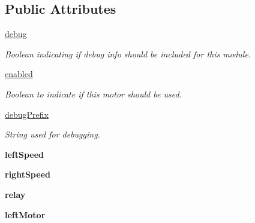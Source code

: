 \subsection*{Public Attributes}
\begin{DoxyCompactItemize}
\item 
\mbox{\label{classDriveControl_1_1DriveControl_a17bd2db1b45e4f0961f2ce6b0b0fbb7d}} 
\hyperlink{classDriveControl_1_1DriveControl_a17bd2db1b45e4f0961f2ce6b0b0fbb7d}{debug}
\begin{DoxyCompactList}\small\item\em Boolean indicating if debug info should be included for this module. \end{DoxyCompactList}\item 
\hyperlink{classDriveControl_1_1DriveControl_a956999a0f333b37334795c1582497eb2}{enabled}
\begin{DoxyCompactList}\small\item\em Boolean to indicate if this motor should be used. \end{DoxyCompactList}\item 
\mbox{\label{classDriveControl_1_1DriveControl_aa70883cb24b6fbd190af99e4c51b1b32}} 
\hyperlink{classDriveControl_1_1DriveControl_aa70883cb24b6fbd190af99e4c51b1b32}{debug\+Prefix}
\begin{DoxyCompactList}\small\item\em String used for debugging. \end{DoxyCompactList}\item 
\mbox{\label{classDriveControl_1_1DriveControl_a930b945c315f31935de7b016414089a3}} 
{\bfseries left\+Speed}
\item 
\mbox{\label{classDriveControl_1_1DriveControl_ab940810318e0dc69e94a9667e7e18653}} 
{\bfseries right\+Speed}
\item 
\mbox{\label{classDriveControl_1_1DriveControl_a0e886e981a0f9758debcfb2baa86d203}} 
{\bfseries relay}
\item 
\mbox{\label{classDriveControl_1_1DriveControl_ab73bac71d7e0bfce95c7bb5b321218fd}} 
{\bfseries left\+Motor}

\end{DoxyCompactItemize}
